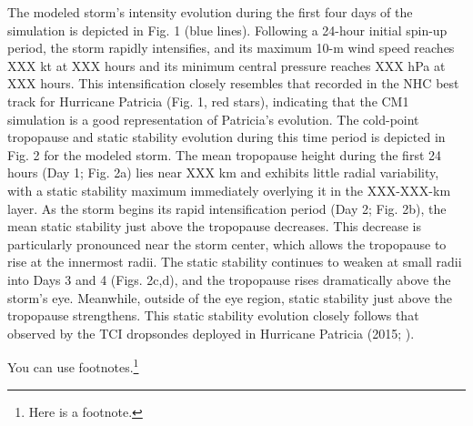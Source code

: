 The modeled storm's intensity evolution during the first four days of the simulation is depicted in Fig. 1 (blue lines).
Following a 24-hour initial spin-up period, the storm rapidly intensifies, and its maximum 10-m wind speed reaches XXX kt at XXX hours and its minimum central pressure reaches XXX hPa at XXX hours.
This intensification closely resembles that recorded in the NHC best track for Hurricane Patricia (Fig. 1, red stars), indicating that the CM1 simulation is a good representation of Patricia's evolution.
The cold-point tropopause and static stability evolution during this time period is depicted in Fig. 2 for the modeled storm.
The mean tropopause height during the first 24 hours (Day 1; Fig. 2a) lies near XXX km and exhibits little radial variability, with a static stability maximum immediately overlying it in the XXX-XXX-km layer.
As the storm begins its rapid intensification period (Day 2; Fig. 2b), the mean static stability just above the tropopause decreases.
This decrease is particularly pronounced near the storm center, which allows the tropopause to rise at the innermost radii.
The static stability continues to weaken at small radii into Days 3 and 4 (Figs. 2c,d), and the tropopause rises dramatically above the storm's eye.
Meanwhile, outside of the eye region, static stability just above the tropopause strengthens.
This static stability evolution closely follows that observed by the TCI dropsondes deployed in Hurricane Patricia (2015; \cite{DuranMolinari2018}).

You can use footnotes.\footnote{Here is a footnote.}
